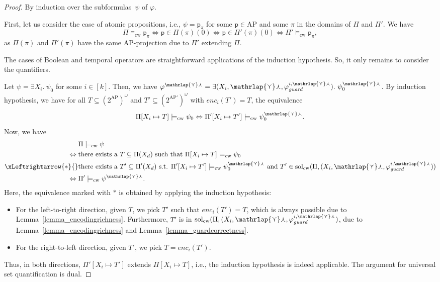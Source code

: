 \documentclass[dvipsnames,10pt,a4paper]{amsart}
\theoremstyle{definition}
\theoremstyle{remark}
\renewcommand{\phi}{\varphi}
\newcommand{\pow}[1]{2^{#1}}
\newcommand{\ap}[0]{\mathrm{AP}}
\newcommand{\unidisvar}{X_d}
\newcommand{\smalar}{{\mathrlap{\curlyvee}\curlywedge}}
\newcommand{\solutions}{\mathrm{sol}}
\newcommand{\proposition}{\texttt{p}}
\newcommand{\cw}{\mathrm{cw}}
\newcommand{\guard}{\mathit{guard}}
\newcommand{\enc}{\mathit{enc}}
\begin{document}
\begin{proof}
By induction over the subformulas~$\psi$ of $\phi$.

First, let us consider the case of atomic propositions, i.e., $\psi = \proposition_\pi$ for some $\proposition \in \ap$ and some $\pi$ in the domains of $\Pi$ and $\Pi'$. We have 
\[
\Pi\models_\cw\proposition_\pi \Leftrightarrow 
\proposition \in \Pi(\pi)(0) \Leftrightarrow 
\proposition \in \Pi'(\pi)(0) \Leftrightarrow 
\Pi'\models_\cw\proposition_\pi,
\]
as $\Pi(\pi)$ and $\Pi'(\pi)$ have the same $\ap$-projection due to $\Pi'$ extending $\Pi$.

The cases of Boolean and temporal operators are straightforward applications of the induction hypothesis. So, it only remains to consider the quantifiers. 

Let $\psi = \exists X_i.\ \psi_0$ for some $i \in [k]$. Then, we have $\varphi^{\smalar} = \exists (X_i, \smalar, \varphi_\guard^{i,\smalar}).\ \psi_0^{\smalar}$.
By induction hypothesis, we have for all $T \subseteq (\pow{\ap})^\omega$ and $T' \subseteq (\pow{\ap'})^\omega$ with $\enc_i(T') = T$, the equivalence
\[\Pi[X_i \mapsto T] \models_\cw \psi_0 \Leftrightarrow \Pi'[X_i \mapsto T' ] \models_\cw \psi_0^{\smalar}.\]
Now, we have 
\begin{align*}
&{}\Pi\models_\cw \psi\\
 \Leftrightarrow{} &{}\text{there exists a $T \subseteq \Pi(\unidisvar)$ such that } \Pi[X_i \mapsto T] \models_\cw \psi_0 \\
\xLeftrightarrow{\ast}{}&{}\text{there exists a $T' \subseteq \Pi'(\unidisvar)$ s.t. } \Pi'[X_i \mapsto T'] \models_\cw \psi_0^{\smalar} \text{ and  } T' \in \solutions_\cw(\Pi,( X_i, \smalar, \varphi_\guard^{i,\smalar} ))
\\
\Leftrightarrow{}&{}\Pi'\models_\cw \psi^{\smalar}.
\end{align*}
Here, the equivalence marked with $\ast$ is obtained by applying the induction hypothesis:
\begin{itemize}
    \item For the left-to-right direction, given $T$, we pick $T'$ such that $\enc_i(T') = T$, which is always possible due to Lemma~\ref{lemma_encodingrichness}. Furthermore, $T'$ is in $\solutions_\cw(\Pi,( X_i, \smalar, \varphi_\guard^{i,\smalar} )$, due to Lemma~\ref{lemma_encodingrichness} and Lemma~\ref{lemma_guardcorrectness}.
    \item For the right-to-left direction, given $T'$, we pick $T = \enc_i(T')$.
\end{itemize}
Thus, in both directions, $\Pi'[X_i \mapsto T']$ extends $\Pi[X_i \mapsto T] $, i.e., the induction hypothesis is indeed applicable.
The argument for universal set quantification is dual.


\end{proof}
\end{document}
